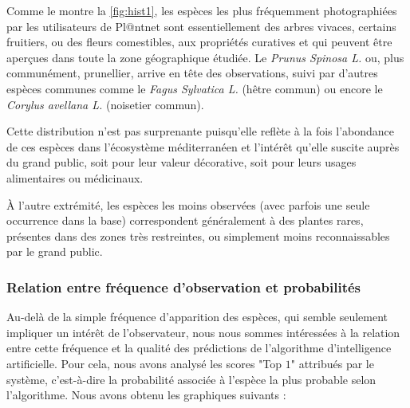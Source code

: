 \documentclass[a4paper,12pt]{article}
\begin{document}
Comme le montre la \autoref{fig:hist1}, les espèces les plus fréquemment photographiées par les utilisateurs de Pl@ntnet sont essentiellement des arbres vivaces, certains fruitiers, ou des fleurs comestibles, aux propriétés curatives et qui peuvent être aperçues dans toute la zone géographique étudiée. Le \textit{Prunus Spinosa L.} ou, plus communément, prunellier, arrive en tête des observations, suivi par d'autres espèces communes comme le \textit{Fagus Sylvatica L.} (hêtre commun) ou encore le \textit{Corylus avellana L.} (noisetier commun).

\vspace{0.2cm}

Cette distribution n'est pas surprenante puisqu'elle reflète à la fois l'abondance de ces espèces dans l'écosystème méditerranéen et l'intérêt qu'elle suscite auprès du grand public, soit pour leur valeur décorative, soit pour leurs usages alimentaires ou médicinaux.

\vspace{0.2cm}

À l'autre extrémité, les espèces les moins observées (avec parfois une seule occurrence dans la base) correspondent généralement à des plantes rares, présentes dans des zones très restreintes, ou simplement moins reconnaissables par le grand public.

\subsubsection{Relation entre fréquence d'observation et probabilités}

Au-delà de la simple fréquence d'apparition des espèces, qui semble seulement impliquer un intérêt de l'observateur, nous nous sommes intéressées à la relation entre cette fréquence et la qualité des prédictions de l'algorithme d'intelligence artificielle. Pour cela, nous avons analysé les scores "Top $1$" attribués par le système, c'est-à-dire la probabilité associée à l'espèce la plus probable selon l'algorithme. Nous avons obtenu les graphiques suivants :
\end{document}
